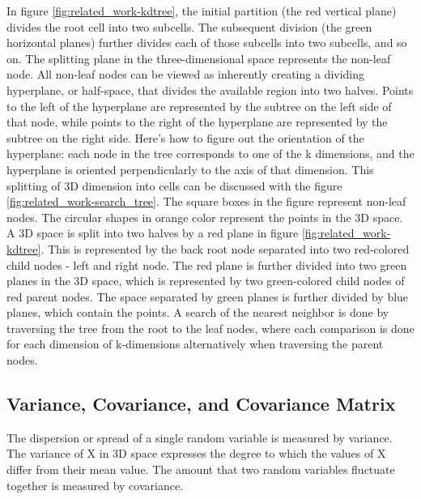 In figure \ref{fig:related_work-kdtree}, the initial partition (the red vertical plane) divides the root cell into two subcells. The subsequent division (the green horizontal planes) further divides each of those subcells into two subcells, and so on. The splitting plane in the three-dimensional space represents the non-leaf node. All non-leaf nodes can be viewed as inherently creating a dividing hyperplane, or half-space, that divides the available region into two halves. Points to the left of the hyperplane are represented by the subtree on the left side of that node, while points to the right of the hyperplane are represented by the subtree on the right side. Here's how to figure out the orientation of the hyperplane: each node in the tree corresponds to one of the k dimensions, and the hyperplane is oriented perpendicularly to the axis of that dimension. This splitting of 3D dimension into cells can be discussed with the figure \ref{fig:related_work-search_tree}. The square boxes in the figure represent non-leaf nodes. The circular shapes in orange color represent the points in the 3D space. A 3D space is split into two halves by a red plane in figure \ref{fig:related_work-kdtree}. This is represented by the back root node separated into two red-colored child nodes - left and right node. The red plane is further divided into two green planes in the 3D space, which is represented by two green-colored child nodes of red parent nodes. The space separated by green planes is further divided by blue planes, which contain the points. A search of the nearest neighbor is done by traversing the tree from the root to the leaf nodes, where each comparison is done for each dimension of k-dimensions alternatively when traversing the parent nodes.

\subsection{Variance, Covariance, and Covariance Matrix}
The dispersion or spread of a single random variable is measured by variance. The variance of X in 3D space expresses the degree to which the values of X differ from their mean value. The amount that two random variables fluctuate together is measured by covariance. 

